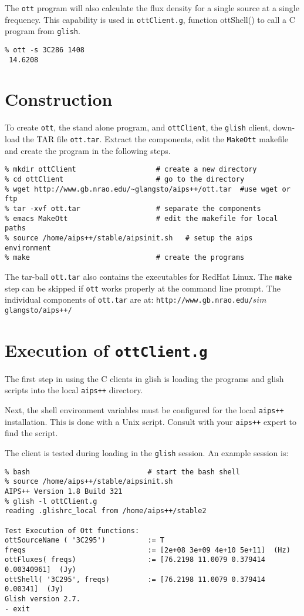 \clearpage
The {\tt ott} program will also calculate the flux density
for a single source at a single frequency.  This capability is
used in {\tt ottClient.g}, function ottShell() to call a C program from 
{\tt glish}.
\begin{verbatim}
% ott -s 3C286 1408
 14.6208
\end{verbatim}

\section{Construction}
To create {\tt ott}, the stand alone program, and {\tt ottClient}, 
the {\tt glish} client, down-load the TAR file {\tt ott.tar}.
Extract the components, edit the {\tt MakeOtt} makefile and
create the program in the following steps.

\begin{verbatim}
% mkdir ottClient                   # create a new directory
% cd ottClient                      # go to the directory
% wget http://www.gb.nrao.edu/~glangsto/aips++/ott.tar  #use wget or ftp
% tar -xvf ott.tar                  # separate the components
% emacs MakeOtt                     # edit the makefile for local paths
% source /home/aips++/stable/aipsinit.sh   # setup the aips environment
% make                              # create the programs
\end{verbatim}

The tar-ball {\tt ott.tar} also contains the executables for
RedHat Linux.  The {\tt make} step can be skipped if {\tt ott}
works properly at the command line prompt. 
The individual components of {\tt ott.tar} are at:
{\tt http://www.gb.nrao.edu/$sim$glangsto/aips++/}

\section{Execution of {\tt ottClient.g}}
The first step in using the C clients in glish is 
loading the programs and glish scripts into the local {\tt aips++}
directory.

Next, the shell environment variables must be configured for the
local {\tt aips++} installation.  This is done with 
a Unix script.  Consult with your {\tt aips++} expert
to find the script.

The client is tested during loading in the {\tt glish} session.
An example session is:

\begin{verbatim}
% bash                            # start the bash shell
% source /home/aips++/stable/aipsinit.sh
AIPS++ Version 1.8 Build 321
% glish -l ottClient.g
reading .glishrc_local from /home/aips++/stable2

Test Execution of Ott functions:
ottSourceName ( '3C295')          := T
freqs                             := [2e+08 3e+09 4e+10 5e+11]  (Hz)
ottFluxes( freqs)                 := [76.2198 11.0079 0.379414 0.00340961]  (Jy)
ottShell( '3C295', freqs)         := [76.2198 11.0079 0.379414 0.00341]  (Jy)
Glish version 2.7.
- exit
\end{verbatim}

